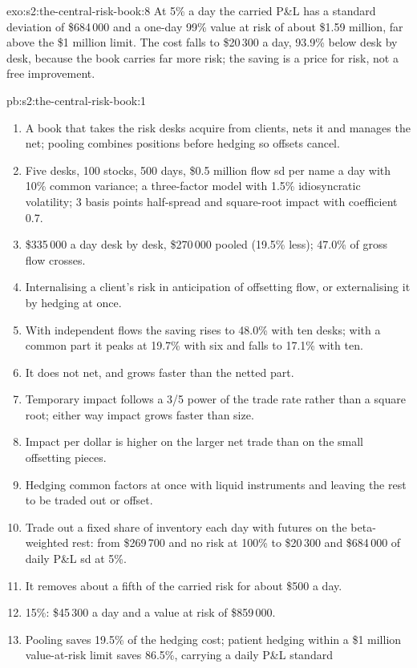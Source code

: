 \begin{solution}{exo:s2:the-central-risk-book:8}
At 5\% a day the carried P\&L has a standard deviation of \$684\,000 and a one-day 99\% value at risk of about \$1.59 million, far above the \$1
million limit. The cost falls to \$20\,300 a day, 93.9\% below desk by desk, because the book carries far more risk; the saving is a price for risk,
not a free improvement.
\end{solution}

\begin{solution}{pb:s2:the-central-risk-book:1}
\begin{enumerate}
\item A book that takes the risk desks acquire from clients, nets it and manages the net; pooling combines positions before hedging so offsets cancel.
\item Five desks, 100 stocks, 500 days, \$0.5 million flow sd per name a day with 10\% common variance; a three-factor model with 1.5\% idiosyncratic
volatility; 3 basis points half-spread and square-root impact with coefficient 0.7.
\item \$335\,000 a day desk by desk, \$270\,000 pooled (19.5\% less); 47.0\% of gross flow crosses.
\item Internalising a client's risk in anticipation of offsetting flow, or externalising it by hedging at once.
\item With independent flows the saving rises to 48.0\% with ten desks; with a common part it peaks at 19.7\% with six and falls to 17.1\% with ten.
\item It does not net, and grows faster than the netted part.
\item Temporary impact follows a 3/5 power of the trade rate rather than a square root; either way impact grows faster than size.
\item Impact per dollar is higher on the larger net trade than on the small offsetting pieces.
\item Hedging common factors at once with liquid instruments and leaving the rest to be traded out or offset.
\item Trade out a fixed share of inventory each day with futures on the beta-weighted rest: from \$269\,700 and no risk at 100\% to \$20\,300 and \$684\,000
of daily P\&L sd at 5\%.
\item It removes about a fifth of the carried risk for about \$500 a day.
\item 15\%: \$45\,300 a day and a value at risk of \$859\,000.
\item Pooling saves 19.5\% of the hedging cost; patient hedging within a \$1 million value-at-risk limit saves 86.5\%, carrying a daily P\&L standard

\end{enumerate}
\end{solution}
